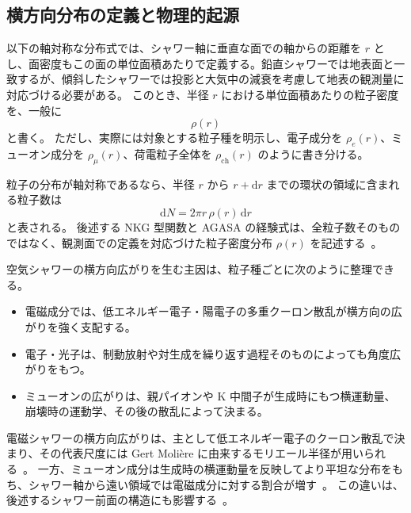 \documentclass[book,paper=a4,fontsize=11pt]{jlreq}
\begin{document}
\subsection{横方向分布の定義と物理的起源}\label{subsec:lateral_definition}\label{subsec:why_lateral}
以下の軸対称な分布式では、シャワー軸に垂直な面での軸からの距離を \(r\) とし、面密度もこの面の単位面積あたりで定義する。鉛直シャワーでは地表面と一致するが、傾斜したシャワーでは投影と大気中の減衰を考慮して地表の観測量に対応づける必要がある。
このとき、半径 \(r\) における単位面積あたりの粒子密度を、一般に
\begin{equation}
  \rho(r)
\end{equation}
と書く。
ただし、実際には対象とする粒子種を明示し、電子成分を \(\rho_e(r)\)、ミューオン成分を \(\rho_\mu(r)\)、荷電粒子全体を \(\rho_{\mathrm{ch}}(r)\) のように書き分ける。

粒子の分布が軸対称であるなら、半径 \(r\) から \(r+\mathrm{d}r\) までの環状の領域に含まれる粒子数は
\begin{equation}
  \mathrm{d}N = 2\pi r\,\rho(r)\,\mathrm{d}r
\end{equation}
と表される。
後述する NKG 型関数と AGASA の経験式は、全粒子数そのものではなく、観測面での定義を対応づけた粒子密度分布 \(\rho(r)\) を記述する~\cite{KamataNishimura1958,Greisen1960,Yoshida1994}。

空気シャワーの横方向広がりを生む主因は、粒子種ごとに次のように整理できる。
\begin{itemize}
  \item 電磁成分では、低エネルギー電子・陽電子の多重クーロン散乱が横方向の広がりを強く支配する。
  \item 電子・光子は、制動放射や対生成を繰り返す過程そのものによっても角度広がりをもつ。
  \item ミューオンの広がりは、親パイオンや K 中間子が生成時にもつ横運動量、崩壊時の運動学、その後の散乱によって決まる。
\end{itemize}
電磁シャワーの横方向広がりは、主として低エネルギー電子のクーロン散乱で決まり、その代表尺度には Gert Moli\`ere に由来するモリエール半径が用いられる~\cite{PDGPassage,PDGCosmicRays}。
一方、ミューオン成分は生成時の横運動量を反映してより平坦な分布をもち、シャワー軸から遠い領域では電磁成分に対する割合が増す~\cite{Cazon2004}。
この違いは、後述するシャワー前面の構造にも影響する~\cite{Cazon2004}。
\end{document}
